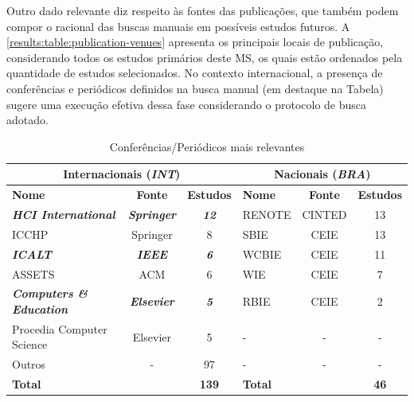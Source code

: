 
Outro dado relevante diz respeito às fontes das publicações, que também podem compor o racional das buscas manuais em possíveis estudos futuros. A \autoref{results:table:publication-venues} apresenta os principais locais de publicação, considerando todos os estudos primários deste MS, os quais estão ordenados pela quantidade de estudos selecionados. No contexto internacional, a presença de conferências e periódicos definidos na busca manual (em destaque na Tabela) sugere uma execução efetiva dessa fase considerando o protocolo de busca adotado.

\begin{table}[htbp]
\caption{Conferências/Periódicos mais relevantes}
\label{results:table:publication-venues}
\centering
\begin{tabular}{lcc|lcc}
\hline
\multicolumn{3}{c|}{\textbf{Internacionais (\textit{INT})}} & \multicolumn{3}{c}{\textbf{Nacionais (\textit{BRA})}} \\ \hline
\textbf{Nome} & \textbf{Fonte} & \textbf{Estudos} & \textbf{Nome} & \textbf{Fonte} & \textbf{Estudos} \\ \hline
\textit{\textbf{HCI International}} & \textit{\textbf{Springer}} & \textit{\textbf{12}} & RENOTE & CINTED & 13 \\ 
ICCHP & Springer & 8 & SBIE & CEIE & 13 \\ 
\textit{\textbf{ICALT}} & \textit{\textbf{IEEE}} & \textit{\textbf{6}} & WCBIE & CEIE & 11 \\ 
ASSETS & ACM & 6 & WIE & CEIE & 7 \\ 
\textit{\textbf{Computers \& Education}} & \textit{\textbf{Elsevier}} & \textit{\textbf{5}} & RBIE & CEIE & 2 \\ 
Procedia Computer Science & Elsevier & 5 & - & - & - \\ 
Outros & - & 97 & - & - & - \\ 
\multicolumn{2}{l}{\textbf{Total}} & \textbf{139} & \multicolumn{2}{l}{\textbf{Total}} & \textbf{46} \\ \hline
\end{tabular}
\fautor
\end{table}

